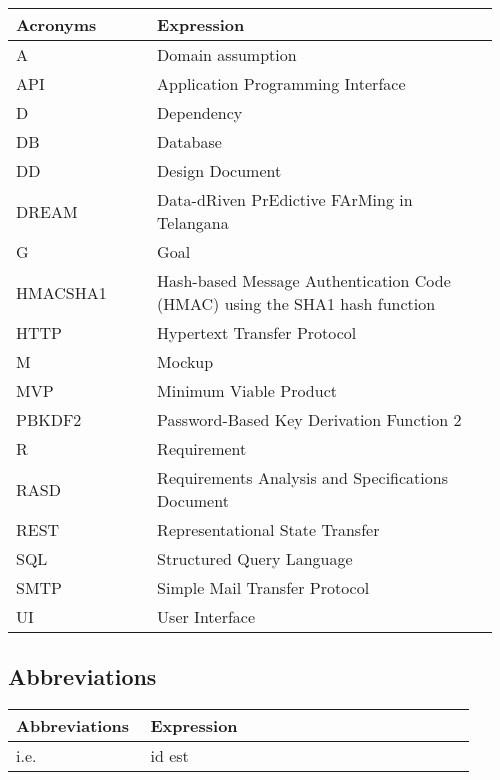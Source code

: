 \begin{center}
	\begin{longtable}{@{}p{0.28\linewidth} p{0.68\linewidth}@{}}
		\toprule
		\textbf{Acronyms}   & \textbf{Expression}\\
		\endfirsthead
		\midrule
		A                   & Domain assumption\\
		API                 & Application Programming Interface\\
		D                   & Dependency \\
		DB                  & Database\\
		DD                  & Design Document\\
		DREAM               & Data-dRiven PrEdictive FArMing in Telangana\\
		G					& Goal\\
		HMACSHA1            & Hash-based Message Authentication Code (HMAC) using the SHA1 hash function \\
		HTTP                & Hypertext Transfer Protocol\\
		M					& Mockup\\
		MVP                 & Minimum Viable Product\\
		PBKDF2              & Password-Based Key Derivation Function 2 \\ 
		R                   & Requirement\\
		RASD                & Requirements Analysis and Specifications Document\\
		REST				& Representational State Transfer\\
		SQL                 & Structured Query Language\\
		SMTP                & Simple Mail Transfer Protocol\\
		UI				  	& User Interface\\
		\bottomrule
	\end{longtable}
\end{center}

\subsection{Abbreviations}

\begin{center}
	\begin{longtable}{@{}p{0.28\linewidth} p{0.68\linewidth}@{}}
		\toprule
		\textbf{Abbreviations}  & \textbf{Expression}\\
		\midrule
	    i.e. & id est\\
		\bottomrule
	\end{longtable}
\end{center}

